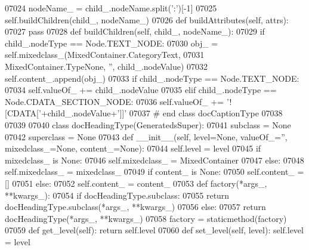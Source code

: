 \begin{DoxyCode}
{{{{{{{{{{{{{{{{{{{{{{{{{{{{{{{{{{{{{{{{{{{{{{{{{{{{{{{{{{{{{{{{{{{{{{{{{{{{{{{{{{{{{{{{{{{{{{{{{{{{{{{{{{{{{{{{{{{{{{{{{{{{{{{{{{{{{{{{{{{{{{{{{{{{{{{{{{{{{{{{{{{{{{{{{{{{{{{{{{{{{{{{{{{{{{{{{{{{{{{{{{{{{{{{{{{{{{{{{{{{{{{{{{{{{{{{{{{{{{{{{{{{{{{{{{{{{{{{{{{{{{{{{{{{{{{{{{{{{{{{{{{{{{{{{{{{{{{{{{{{{{{{{{{{{{{{{{{{{{{{{{{{{{{{{{{{{{{{{{{{{{{{{{{{{{{{{{{{{{{{{{{{{{{{{{{{{{{{{{{{{{{{{{{{{{{{{{{{{{{{{{{{{{{{{{{{{{{{{{{{{{{{{{{{{{{{{07024             nodeName\_ = child\_.nodeName.split(\textcolor{stringliteral}{':'})[-1]
07025             self.buildChildren(child\_, nodeName\_)
07026     \textcolor{keyword}{def }buildAttributes(self, attrs):
07027         \textcolor{keywordflow}{pass}
07028     \textcolor{keyword}{def }buildChildren(self, child\_, nodeName\_):
07029         \textcolor{keywordflow}{if} child\_.nodeType == Node.TEXT\_NODE:
07030             obj\_ = self.mixedclass\_(MixedContainer.CategoryText,
07031                 MixedContainer.TypeNone, \textcolor{stringliteral}{''}, child\_.nodeValue)
07032             self.content\_.append(obj\_)
07033         \textcolor{keywordflow}{if} child\_.nodeType == Node.TEXT\_NODE:
07034             self.valueOf\_ += child\_.nodeValue
07035         \textcolor{keywordflow}{elif} child\_.nodeType == Node.CDATA\_SECTION\_NODE:
07036             self.valueOf\_ += \textcolor{stringliteral}{'![CDATA['}+child\_.nodeValue+\textcolor{stringliteral}{']]'}
07037 \textcolor{comment}{# end class docCaptionType}
07038 
07039 
07040 \textcolor{keyword}{class }docHeadingType(GeneratedsSuper):
07041     subclass = \textcolor{keywordtype}{None}
07042     superclass = \textcolor{keywordtype}{None}
07043     \textcolor{keyword}{def }__init__(self, level=None, valueOf\_='', mixedclass\_=None, content\_=None):
07044         self.level = level
07045         \textcolor{keywordflow}{if} mixedclass\_ \textcolor{keywordflow}{is} \textcolor{keywordtype}{None}:
07046             self.mixedclass_ = MixedContainer
07047         \textcolor{keywordflow}{else}:
07048             self.mixedclass_ = mixedclass\_
07049         \textcolor{keywordflow}{if} content\_ \textcolor{keywordflow}{is} \textcolor{keywordtype}{None}:
07050             self.content_ = []
07051         \textcolor{keywordflow}{else}:
07052             self.content_ = content\_
07053     \textcolor{keyword}{def }factory(*args\_, **kwargs\_):
07054         \textcolor{keywordflow}{if} docHeadingType.subclass:
07055             \textcolor{keywordflow}{return} docHeadingType.subclass(*args\_, **kwargs\_)
07056         \textcolor{keywordflow}{else}:
07057             \textcolor{keywordflow}{return} docHeadingType(*args\_, **kwargs\_)
07058     factory = staticmethod(factory)
07059     \textcolor{keyword}{def }get_level(self): \textcolor{keywordflow}{return} self.level
07060     \textcolor{keyword}{def }set_level(self, level): self.level = level
}}}}}}}}}}}}}}}}}}}}}}}}}}}}}}}}}}}}}}}}}}}}}}}}}}}}}}}}}}}}}}}}}}}}}}}}}}}}}}}}}}}}}}}}}}}}}}}}}}}}}}}}}}}}}}}}}}}}}}}}}}}}}}}}}}}}}}}}}}}}}}}}}}}}}}}}}}}}}}}}}}}}}}}}}}}}}}}}}}}}}}}}}}}}}}}}}}}}}}}}}}}}}}}}}}}}}}}}}}}}}}}}}}}}}}}}}}}}}}}}}}}}}}}}}}}}}}}}}}}}}}}}}}}}}}}}}}}}}}}}}}}}}}}}}}}}}}}}}}}}}}}}}}}}}}}}}}}}}}}}}}}}}}}}}}}}}}}}}}}}}}}}}}}}}}}}}}}}}}}}}}}}}}}}}}}}}}}}}}}}}}}}}}}}}}}}}}}}}}}}}}}}}}}}}}}}}}}}}}}}}}}}}}}}}}}}}
\end{DoxyCode}
